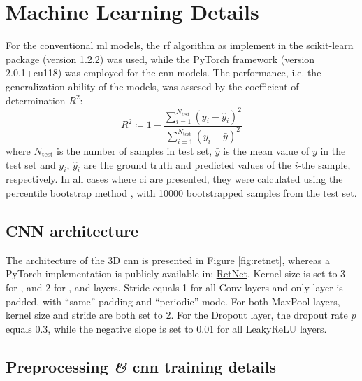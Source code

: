 \section{Machine Learning Details}

For the conventional \gls{ml} models, the \gls{rf} algorithm as implement in the
scikit-learn \parencite{sklearn} package (version
1.2.2) was used, while the PyTorch \parencite{pytorch}
framework (version 2.0.1+cu118) was employed for the \gls{cnn} models. The
performance, i.e. the generalization ability of
the models, was assesed by the coefficient of determination $R^2$:
\begin{equation}
	R^2 \coloneqq 1 -
	\frac{
		\sum_{i=1}^{N_\text{test}}
		(y_i - \hat{y}_i)^2
	}{
		\sum_{i=1}^{N_\text{test}}
		(y_i - \bar{y})^2
	}
\end{equation}
where $N_\text{test}$ is the number of samples in test
set, $\bar{y}$ is the mean value of $y$ in the test set and
$y_i$, $\hat{y}_i$ are the ground truth and predicted values of the $i$-the
sample, respectively. In all cases where \gls{ci} are presented, they were
calculated using the percentile bootstrap method \parencite{Efron_1994}, with
\num{10000} bootstrapped samples from the test set.

\subsection{CNN architecture}

The architecture of the 3D \gls{cnn} is presented in Figure \ref{fig:retnet},
whereas a PyTorch implementation is publicly available in:
\href{https://github.com/frudakis-research-group/retnet}{RetNet}.
Kernel size is set to \num{3} for ,  and
\num{2} for ,  and  layers. Stride equals
\num{1} for all Conv layers and only  layer is padded,
with ``same'' padding and ``periodic'' mode. For both MaxPool
layers, kernel size and stride are both set to \num{2}. For
the Dropout layer, the dropout rate $p$
equals \num{0.3}, while the negative slope is set to \num{0.01} for all
LeakyReLU layers.

\subsection{Preprocessing \textit{\&} \acrshort{cnn} training details}
\label{subsec:preprocessing}


